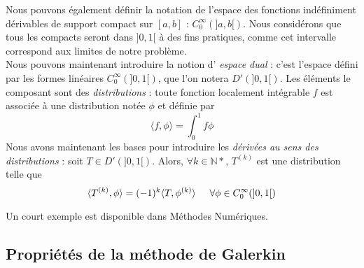 \documentclass[12pt]{article}
\newcommand{\N}{\mathbb N}
\newcommand{\espace}{\hspace{5mm}}
\begin{document}
Nous pouvons également définir la notation de l'espace des fonctions indéfiniment dérivables de support compact sur $[a,b]$ : $C_0^\infty (]a,b[)$. Nous considérons que tous les compacts seront dans $]0,1[$ à des fins pratiques, comme cet intervalle correspond aux limites de notre problème.\\
Nous pouvons maintenant introduire la notion d' \emph{espace dual} : c'est l'espace défini par les formes linéaires $C_0^\infty (]0,1[)$, que l'on notera $D'(]0,1[)$. Les éléments le composant sont des \emph{distributions} : toute fonction localement intégrable $f$ est associée à une distribution notée $\phi$ et définie par
\begin{equation}
\langle f, \phi \rangle = \int_0^1 f \phi
\end{equation}
Nous avons maintenant les bases pour introduire les \emph{dérivées au sens des distributions} : soit $T \in D'(]0,1[)$. Alors, $\forall k \in \N *$, $T^{(k)}$ est une distribution telle que 
\begin{equation}
\langle T^{(k)}, \phi \rangle = (-1)^k \langle T, \phi^{(k)} \rangle \espace \forall \phi \in C_0^\infty(]0,1[)
\end{equation}

Un court exemple est disponible dans Méthodes Numériques.

\subsection{Propriétés de la méthode de Galerkin}
\end{document}
